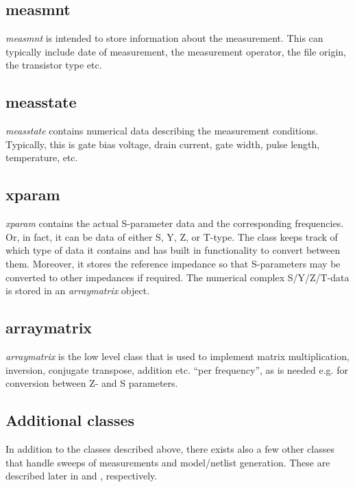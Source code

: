 \subsection{measmnt}
\emph{measmnt} is intended to store information about the
measurement. This can typically include date of measurement, the
measurement operator, the file origin, the transistor type etc.

\subsection{measstate}
\emph{measstate} contains numerical data describing the
measurement conditions. Typically, this is gate bias voltage,
drain current, gate width, pulse length, temperature,
etc.

\subsection{xparam}
\emph{xparam} contains the actual S-parameter data and the corresponding frequencies. 
Or, in fact, it can be data of either S, Y, Z, or T-type. The class keeps track
of which type of data it contains and has built in functionality
to convert between them. Moreover, it stores the reference
impedance so that S-parameters may be converted to other
impedances if required. The numerical complex S/Y/Z/T-data is
stored in an \emph{arraymatrix} object.

\subsection{arraymatrix}
\emph{arraymatrix} is the low level class that is used to
implement matrix multiplication, inversion, conjugate transpose,
addition etc. ``per frequency'', as is needed e.g. for conversion
between Z- and S parameters.

\subsection{Additional classes}
In addition to the classes described above, there exists also a
few other classes that handle sweeps of measurements and
model/netlist generation. These are described later in
 and , respectively.
